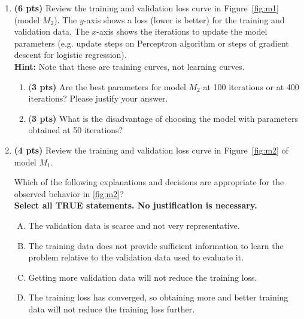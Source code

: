 \documentclass{article}
\begin{document}
\begin{enumerate}
[1.]
\item \textbf{(6 pts)} Review the training and validation loss curve in Figure~\ref{fig:m1} (model $M_2$).
The $y$-axis shows a loss (lower is better) for the training and validation data.
The $x$-axis shows the iterations to update the model parameters (e.g. update steps on Perceptron algorithm or steps of gradient descent for logistic regression).\\
{\bf Hint:} Note that these are training curves, not learning curves.



\begin{enumerate}

\item {(\bf 3 pts)} Are the best parameters for model $M_2$ at 100 iterations or at 400 iterations? Please justify your answer.

\begin{tcolorbox}[breakable,
enhanced,
notitle,
width=14.5cm,
height=2cm]
{
}
%

\end{tcolorbox}
\item {(\bf 3 pts)} What is the disadvantage of choosing the model with parameters obtained at 50 iterations?

\begin{tcolorbox}[breakable,
enhanced,
notitle,
width=14.5cm,
height=2cm]
%
{
}
%
\end{tcolorbox}
\end{enumerate}

\newpage
\item \textbf{(4 pts)} Review the training and validation loss curve in Figure~\ref{fig:m2} of model $M_1$. 

Which of the following explanations and decisions are appropriate for the observed behavior in \ref{fig:m2}?\\
{\bf Select all TRUE statements. No justification is necessary.}
\begin{enumerate}[(A)]
    \item The validation data is scarce and not very representative.
    \item The training data does not provide sufficient information to learn the problem relative to the validation data used to evaluate it.
    \item Getting more validation data will not reduce the training loss.
    \item The training loss has converged, so obtaining more and better training data will not reduce the training loss further.
\end{enumerate}


\end{enumerate}
\end{document}
